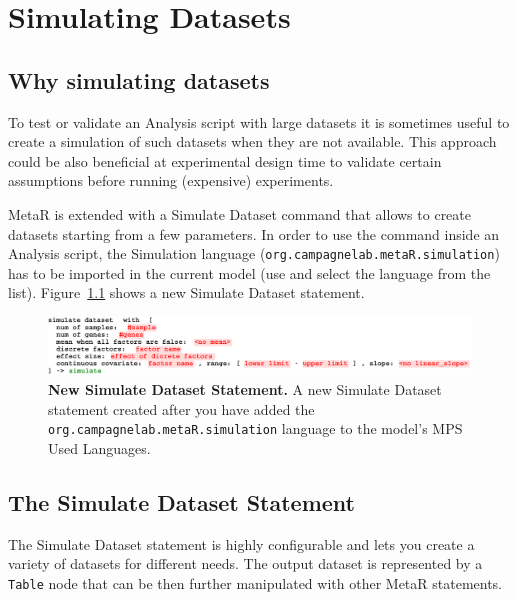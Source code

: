 

\chapter{Simulating Datasets}\label{chap:SimulatingDatasets}

\section{Why simulating datasets}

To test or validate an Analysis script with large datasets it is sometimes useful to create a simulation of such datasets when they are not available. This approach could be also beneficial at experimental design time to validate certain assumptions before running (expensive) experiments.

MetaR is extended with a Simulate Dataset command that allows to create datasets starting from a few parameters. In order to use the command inside an Analysis script, the Simulation language (\texttt{org.campagnelab.metaR.simulation}) has to be imported in the current model (use  and select the language from the list). Figure~\ref{fig:NewSimulateStatement} shows a new Simulate Dataset statement.

\begin{figure}[h!tbp]
  \centering
  \includegraphics[width=\figWidthWide]{figures/NewSimulateStatement.pdf}
\caption[New Simulate Dataset Statement.]{\textbf{New Simulate Dataset Statement.} A new Simulate Dataset statement created after you have added the \texttt{org.campagnelab.metaR.simulation} language to the model's MPS Used Languages.}
\label{fig:NewSimulateStatement}
\end{figure}
 

\section{The Simulate Dataset Statement}
The Simulate Dataset statement is highly configurable and lets you create a variety of datasets for different needs.  The output dataset is represented by a \texttt{Table} node that can be then further manipulated with other MetaR statements. 

